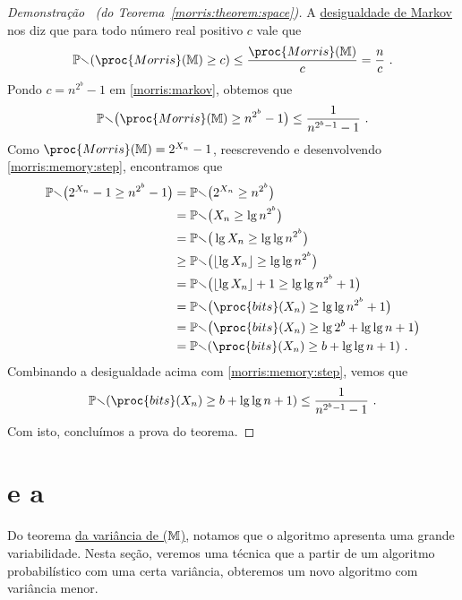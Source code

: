 \begin{proof}[Demonstração \ (do Teorema~\ref{morris:theorem:space})]
  A \hyperref[ap:markov]{desigualdade de Markov} nos diz que para todo número real positivo $c$ vale que
  \begin{align}
    \Pbb(\proc{Morris}(\Mbb) \geq c) \leq \frac{\proc{Morris}(\Mbb)}{c} = \frac{n}{c} \ . \label{morris:markov}
  \end{align}
  Pondo $c = n^{2^b} - 1$ em \eqref{morris:markov}, obtemos que
  \begin{align}
    \Pbb\big(\proc{Morris}(\Mbb) \geq n^{2^b} - 1\big) \leq \frac{1}{n^{2^b-1} - 1} \ . \label{morris:memory:step}
  \end{align}
  Como $\proc{Morris}(\Mbb) = 2^{X_n} - 1$, reescrevendo e desenvolvendo \eqref{morris:memory:step}, encontramos que
  \begin{align*}
    \Pbb\big(2^{X_n} - 1 \geq n^{2^b} - 1\big)
    &=  \Pbb\big(2^{X_n} \geq n^{2^b}\big) \\
    &=  \Pbb\big(X_n \geq \lg n^{2^b}\big) \\
    &=  \Pbb\big(\lg X_n \geq \lg \lg n^{2^b}\big) \\
    &\geq  \Pbb\big(\lfloor\lg X_n\rfloor \geq \lg \lg n^{2^b}\big) \\
    &=  \Pbb\big(\lfloor\lg X_n\rfloor + 1 \geq \lg \lg n^{2^b} + 1\big) \\
    &=  \Pbb\big(\proc{bits}(X_n) \geq \lg \lg n^{2^b} + 1\big) \\
    &=  \Pbb\big(\proc{bits}(X_n) \geq \lg 2^{b} + \lg \lg n + 1\big) \\
    &=  \Pbb(\proc{bits}(X_n) \geq b + \lg \lg n + 1) \ .
  \end{align*}
  Combinando a desigualdade acima com \eqref{morris:memory:step}, vemos que
  \[  \Pbb(\proc{bits}(X_n) \geq b + \lg \lg n + 1) \leq \frac{1}{n^{2^b-1} - 1} \ . \]
  Com isto, concluímos a prova do teorema.
\end{proof}

\section{ e a }
\label{sec:morris:plus}

Do teorema \hyperref[morris:theorem:variance]{da variância de ($\mathbb{M}$)}, notamos que o algoritmo apresenta
uma grande variabilidade. Nesta seção, veremos uma técnica que a partir de um algoritmo probabilístico com uma certa 
variância, obteremos um novo algoritmo com variância menor.

